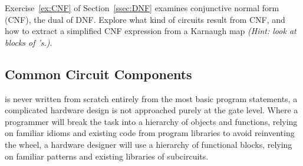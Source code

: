 \begin{exercises}
\item Exercise~\ref{ex:CNF} of Section~\ref{ssec:DNF} examines conjunctive normal form (CNF), the dual of DNF. Explore what kind of circuits result from CNF, and how to extract a simplified CNF expression from a Karnaugh map \textit{(Hint: look at blocks of \0's.)}.
\end{exercises}

\subsection{Common Circuit Components}
 is never written from scratch entirely from the most basic program statements, a complicated hardware design is not approached purely at the gate level. Where a programmer will break the task into a hierarchy of objects and functions, relying on familiar idioms and existing code from program libraries to avoid reinventing the wheel, a hardware designer will use a hierarchy of functional blocks, relying on familiar patterns and existing libraries of subcircuits.

